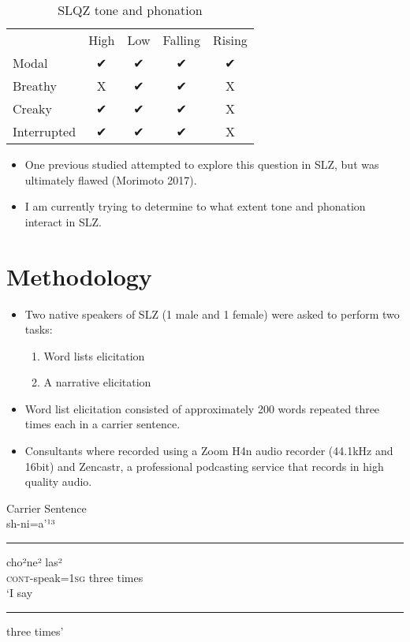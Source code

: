 \documentclass[12pt, letterpaper]{article}
\providecommand{\lsptoprule}{\midrule\toprule}
\providecommand{\lspbottomrule}{\bottomrule\midrule}
\begin{document}
\begin{table}[!h]
\centering
\caption{SLQZ tone and phonation}
\label{tab:slqz}
 \begin{tabular}{lcccc}
  \lsptoprule
  				&	 High  & Low & Falling & Rising \\
  	Modal	& ✔︎ & ✔︎ & ✔︎ & ✔︎ \\
  	Breathy & X & ✔︎ & ✔︎ & X \\
  	Creaky & ✔︎ & ✔︎ & ✔︎ & X \\
  	Interrupted & ✔︎ & ✔︎ & ✔︎ & X \\
  \lspbottomrule
 \end{tabular}
\end{table}

\begin{itemize}
	\item One previous studied attempted to explore this question in SLZ, but was ultimately flawed (Morimoto 2017). 
	\item I am currently trying to determine to what extent tone and phonation interact in SLZ. 
\end{itemize}

\section{Methodology} \label{sec:Methodology}
\begin{itemize}
	\item Two native speakers of SLZ (1 male and 1 female) were asked to perform two tasks: 	
	\begin{enumerate}
		\item Word lists elicitation
		\item A narrative elicitation
	\end{enumerate}

	\item Word list elicitation consisted of approximately 200 words repeated three times each in a carrier sentence. 
	\item Consultants where recorded using a Zoom H4n audio recorder (44.1kHz and 16bit) and Zencastr, a professional podcasting service that records in high quality audio. 
\end{itemize}

\ea Carrier Sentence \label{ex:carrier}\\
\gll sh-ni=a'¹³ \rule{10mm}{1pt} cho²ne² las²\\ 
\textsc{cont}-speak=1\textsc{sg} {} three times\\
\trans `I say \rule{10mm}{1pt} three times'	
\z 
\end{document}
